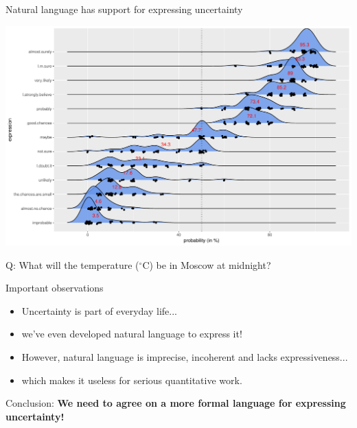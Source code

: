 \begin{frame}{Natural language has support for expressing uncertainty}
\begin{center}
\includegraphics[width=0.95\linewidth]{../LectureAssets/L01/questionnaire}
\end{center}
\end{frame}

\begin{frame}{}
\centering
\bigskip
\bigskip
\smallskip
\begin{LARGE}
{\color{red} Q:} What will the temperature ($^\circ$C) be in Moscow at midnight?
\end{LARGE}
\end{frame}

\begin{frame}{Important observations}

\bigskip

\begin{itemize}\itemsep1.2em

\item Uncertainty is part of everyday life...

\item we've even developed natural language to express it!

\item However, natural language is imprecise, incoherent and lacks expressiveness...

\item which makes it useless for serious quantitative work.

\end{itemize}

\bigskip

Conclusion: \textbf{We need to agree on a more formal language for expressing uncertainty!}

\bigskip

\end{frame}


